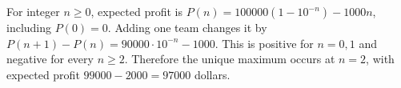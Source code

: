 For integer $n\ge0$, expected profit is $P(n)=100000(1-10^{-n})-1000n$, including $P(0)=0$. Adding one team changes it by $P(n+1)-P(n)=90000\cdot10^{-n}-1000$. This is positive for $n=0,1$ and negative for every $n\ge2$. Therefore the unique maximum occurs at $\boxed{n=2}$, with expected profit $99000-2000=97000$ dollars.
